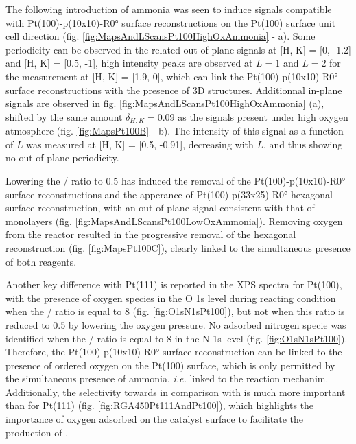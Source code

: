 The following introduction of ammonia was seen to induce signals compatible with Pt(100)-p(10x10)-R\ang{0} surface reconstructions on the Pt(100) surface unit cell direction (fig. \ref{fig:MapsAndLScansPt100HighOxAmmonia} - a).
Some periodicity can be observed in the related out-of-plane signals at [H, K] = [0, -1.2] and [H, K] = [0.5, -1], high intensity peaks are observed at $L=1$ and $L=2$ for the measurement at [H, K] = [1.9, 0], which can link the Pt(100)-p(10x10)-R\ang{0} surface reconstructions with the presence of 3D structures.
Additionnal in-plane signals are observed in fig. \ref{fig:MapsAndLScansPt100HighOxAmmonia} (a), shifted by the same amount $\delta_{H, K}=0.09$ as the signals present under high oxygen atmosphere (fig. \ref{fig:MapsPt100B} - b).
The intensity of this signal as a function of $L$ was measured at [H, K] = [0.5, -0.91], decreasing with $L$, and thus showing no out-of-plane periodicity.

Lowering the / ratio to \num{0.5} has induced the removal of the Pt(100)-p(10x10)-R\ang{0} surface reconstructions and the apperance of Pt(100)-p(33x25)-R\ang{0} hexagonal surface reconstruction, with an out-of-plane signal consistent with that of monolayers (fig. \ref{fig:MapsAndLScansPt100LowOxAmmonia}).
Removing oxygen from the reactor resulted in the progressive removal of the hexagonal reconstruction (fig. \ref{fig:MapsPt100C}), clearly linked to the simultaneous presence of both reagents.

Another key difference with Pt(111) is reported in the XPS spectra for Pt(100), with the presence of oxygen species in the O 1s level during reacting condition when the / ratio is equal to \num{8} (fig. \ref{fig:O1sN1sPt100}), but not when this ratio is reduced to \num{0.5} by lowering the oxygen pressure.
No adsorbed nitrogen specie was identified when the / ratio is equal to \num{8} in the N 1s level  (fig. \ref{fig:O1sN1sPt100}).
Therefore, the Pt(100)-p(10x10)-R\ang{0} surface reconstruction can be linked to the presence of ordered oxygen on the Pt(100) surface, which is only permitted by the simultaneous presence of ammonia, \textit{i.e.} linked to the reaction mechanim.
Additionally, the selectivity towards  in comparison with  is much more important than for Pt(111) (fig. \ref{fig:RGA450Pt111AndPt100}), which highlights the importance of oxygen adsorbed on the catalyst surface to facilitate the production of .

